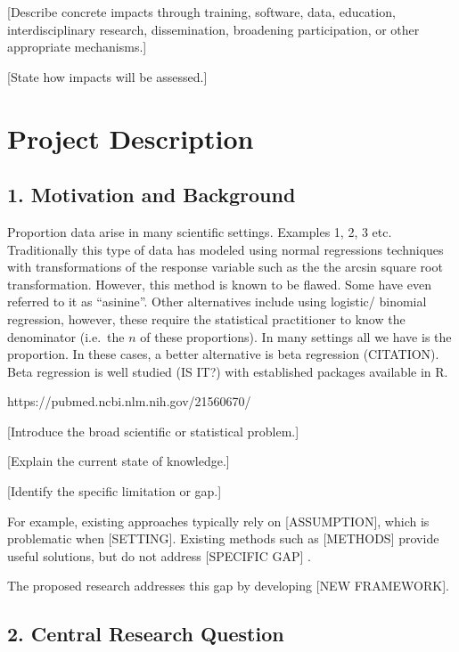 \documentclass[
  11pt,
  letterpaper,
]{article}
\begin{document}
{[}Describe concrete impacts through training, software, data,
education, interdisciplinary research, dissemination, broadening
participation, or other appropriate mechanisms.{]}

{[}State how impacts will be assessed.{]}

\section{Project Description}\label{project-description}

\subsection{1. Motivation and
Background}\label{motivation-and-background}

Proportion data arise in many scientific settings. Examples 1, 2, 3 etc.
Traditionally this type of data has modeled using normal regressions
techniques with transformations of the response variable such as the the
arcsin square root transformation. However, this method is known to be
flawed. Some have even referred to it as ``asinine''. Other alternatives
include using logistic/ binomial regression, however, these require the
statistical practitioner to know the denominator (i.e.~the \(n\) of
these proportions). In many settings all we have is the proportion. In
these cases, a better alternative is beta regression (CITATION). Beta
regression is well studied (IS IT?) with established packages available
in R. \citet{Kosmidis2026}

https://pubmed.ncbi.nlm.nih.gov/21560670/

{[}Introduce the broad scientific or statistical problem.{]}

{[}Explain the current state of knowledge.{]}

{[}Identify the specific limitation or gap.{]}

For example, existing approaches typically rely on {[}ASSUMPTION{]},
which is problematic when {[}SETTING{]}. Existing methods such as
{[}METHODS{]} provide useful solutions, but do not address {[}SPECIFIC
GAP{]} \citep{example2024}.

The proposed research addresses this gap by developing {[}NEW
FRAMEWORK{]}.

\subsection{2. Central Research
Question}\label{central-research-question}
\end{document}

